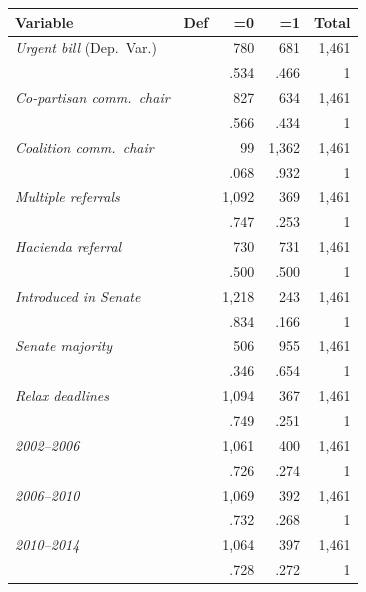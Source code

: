 \documentclass[letter,12pt]{article}
\begin{document}
\begin{footnotesize}

\begin{tabular}{llrrr}
 Variable                          & Def &       =0 &       =1 & Total  \\ \hline
\emph{Urgent bill} (Dep.~Var.)     &     &    780 &   681 & 1,461 \\ [-.75ex]
                                   &     &   .534 &  .466 &   1   \\
\emph{Co-partisan comm.~chair}     &     &    827 &   634 & 1,461 \\ [-.75ex]
                                   &     &   .566 &  .434 &   1   \\
\emph{Coalition comm.~chair}       &     &     99 & 1,362 & 1,461 \\ [-.75ex]
                                   &     &   .068 &  .932 &   1   \\
\emph{Multiple referrals}          &     &  1,092 &   369 & 1,461 \\ [-.75ex]
                                   &     &   .747 &  .253 &   1   \\
\emph{Hacienda referral}           &     &    730 &   731 & 1,461 \\ [-.75ex]
                                   &     &   .500 &  .500 &   1   \\
\emph{Introduced in Senate}        &     &  1,218 &   243 & 1,461 \\ [-.75ex]
                                   &     &   .834 &  .166 &   1   \\
\emph{Senate majority}             &     &    506 &   955 & 1,461 \\ [-.75ex]
                                   &     &   .346 &  .654 &   1   \\
\emph{Relax deadlines}             &     &  1,094 &   367 & 1,461 \\ [-.75ex]
                                   &     &   .749 &  .251 &   1   \\
\emph{2002--2006}                  &     &  1,061 &   400 & 1,461 \\ [-.75ex]
                                   &     &   .726 &  .274 &   1   \\
\emph{2006--2010}                  &     &  1,069 &   392 & 1,461 \\ [-.75ex]
                                   &     &   .732 &  .268 &   1   \\
\emph{2010--2014}                  &     &  1,064 &   397 & 1,461 \\ [-.75ex]
                                   &     &   .728 &  .272 &   1   \\
\end{tabular}

\end{footnotesize}
  
\end{document}

